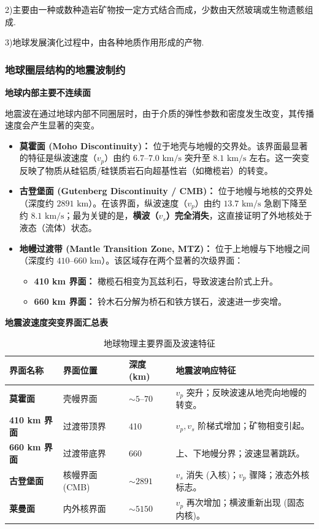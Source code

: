 \documentclass[12pt,a4paper]{article}
\begin{document}
	2)主要由一种或数种造岩矿物按一定方式结合而成，少数由天然玻璃或生物遗骸组成.
	
	3)地球发展演化过程中，由各种地质作用形成的产物.
	
	\subsubsection{地球圈层结构的地震波制约}
	
	\textbf{地球内部主要不连续面}
	
	地震波在通过地球内部不同圈层时，由于介质的弹性参数和密度发生改变，其传播速度会产生显著的突变。
	
	\begin{itemize}[leftmargin=1.5em]
		\item \textbf{莫霍面 (Moho Discontinuity)：} 
		位于地壳与地幔的交界处。该界面最显著的特征是纵波速度（$v_p$）由约 $6.7\text{--}7.0 \text{ km/s}$ 突升至 $8.1 \text{ km/s}$ 左右。这一突变反映了物质从硅铝质/硅镁质岩石向超基性岩（如橄榄岩）的转变。
		
		\item \textbf{古登堡面 (Gutenberg Discontinuity / CMB)：} 
		位于地幔与地核的交界处（深度约 $2891 \text{ km}$）。在该界面，纵波速度（$v_p$）由约 $13.7 \text{ km/s}$ 急剧下降至约 $8.1 \text{ km/s}$；最为关键的是，\textbf{横波（$v_s$）完全消失}，这直接证明了外地核处于液态（流体）状态。
		
		\item \textbf{地幔过渡带 (Mantle Transition Zone, MTZ)：} 
		位于上地幔与下地幔之间（深度约 $410\text{--}660 \text{ km}$）。该区域存在两个显著的次级界面：
		\begin{itemize}
			\item \textbf{410 km 界面：} 橄榄石相变为瓦兹利石，导致波速台阶式上升。
			\item \textbf{660 km 界面：} 铃木石分解为桥石和铁方镁石，波速进一步突增。
		\end{itemize}
	\end{itemize}
	
	\textbf{地震波速度突变界面汇总表}
	
	\begin{table}[htbp]
		\centering
		\caption{地球物理主要界面及波速特征}
		\label{tab:discontinuities}
		\begin{tabularx}{\textwidth}{l l l X}
			\toprule
			界面名称 & 界面位置 & 深度 (km) & 地震波响应特征 \\
			\midrule
			\textbf{莫霍面} & 壳幔界面 & $\sim 5\text{--}70$ & $v_p$ 突升；反映波速从地壳向地幔的转变。 \\
			\addlinespace
			\textbf{410 km 界面} & 过渡带顶界 & 410 & $v_p, v_s$ 阶梯式增加；矿物相变引起。 \\
			\addlinespace
			\textbf{660 km 界面} & 过渡带底界 & 660 & 上、下地幔分界；波速显著跳跃。 \\
			\addlinespace
			\textbf{古登堡面} & 核幔界面 (CMB) & $\sim 2891$ & $v_s$ 消失 (入核)；$v_p$ 骤降；液态外核标志。 \\
			\addlinespace
			\textbf{莱曼面} & 内外核界面 & $\sim 5150$ & $v_p$ 再次增加；横波重新出现 (固态内核)。 \\
			\bottomrule
		\end{tabularx}
	\end{table}
	
\end{document}
